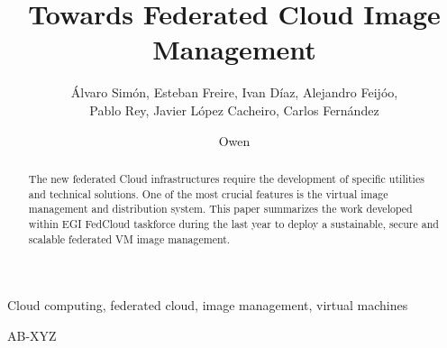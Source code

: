 \documentclass{cai}
\begin{document}
\label{firstpage}

\title[Towards Federated Cloud Image Management]
      {Towards Federated Cloud Image Management}

\author[A. Sim\'on, E. Freire, I. D\'iaz, A. Feij\'oo, P. Rey, J. Cacheiro, C. Fern\'andez]
       {\'Alvaro Sim\'on, Esteban Freire, Ivan D\'iaz, Alejandro Feij\'oo, \\
Pablo Rey, Javier L\'opez Cacheiro, Carlos Fern\'andez}



\author[O. Synge]
       {Owen }





%
%

\noreceived{} \nocommunicated{}

\maketitle

\begin{abstract}
The new federated Cloud infrastructures require the development of specific utilities and technical solutions. One of the most crucial features is the virtual image management and distribution system.
This paper summarizes the work developed within EGI FedCloud taskforce during the last year to deploy a sustainable, secure and scalable federated VM image management.
\end{abstract}

\begin{keywords}
Cloud computing, federated cloud, image management, virtual machines
\end{keywords}

\begin{mathclass}
AB-XYZ
\end{mathclass}
\end{document}
